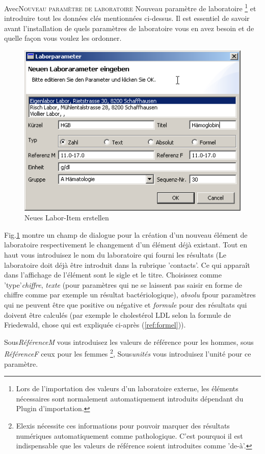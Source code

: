 Avec\textsc{Nouveau paramètre de laboratoire } Nouveau paramètre de laboratoire \footnote{Lors de l'importation des valeurs d'un laboratoire externe, les éléments nécessaires sont normalement automatiquement introduits dépendant du Plugin d'importation.} et introduire tout les données clés mentionnées ci-dessus.  Il est essentiel de savoir avant l'installation de quels paramètres de laboratoire vous en avez besoin et de quelle façon vous voulez les ordonner.
\begin{figure}[htp]
\begin{center}
  \includegraphics{images/labor1}
  \caption{Neues Labor-Item erstellen}
  \label{fig:labor1}
\end{center}
\end{figure}

 Fig.\ref{fig:labor1} montre un champ de dialogue pour la création d'un nouveau élément de laboratoire respectivement le changement d'un élément déjà existant. Tout en haut vous introduisez le nom du laboratoire qui fourni les résultats (Le laboratoire doit déjà être introduit dans la rubrique 'contacts'. Ce qui apparaît dans l'affichage de l'élément sont le sigle et le titre. Choisissez comme 'type'\textit{chiffre}, \textit{texte} (pour paramètres qui ne se laissent pas saisir en forme de chiffre comme par exemple un résultat bactériologique), \textit{absolu} fpour paramètres qui ne peuvent être que positive ou négative et \textit{formule} pour des résultats qui doivent être calculés (par exemple le cholestérol LDL selon la formule de Friedewald, chose qui est expliquée ci-après (\ref{ref:formel})).

 Sous\textit{RéférenceM} vous introduisez les valeurs de référence pour les hommes, sous \textit{RéférenceF} ceux pour les femmes \footnote{Elexis nécessite ces informations pour pouvoir marquer des résultats numériques automatiquement comme pathologique. C'est pourquoi il est indispensable que les valeurs de référence soient introduites comme 'de-à'.}, Sous\textit{unités} vous introduisez l'unité pour ce paramètre.

